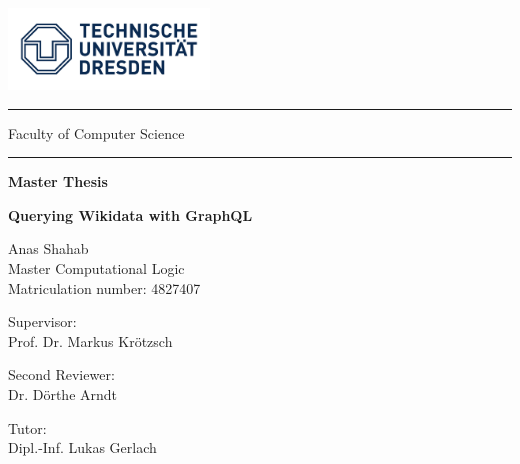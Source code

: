 \begin{titlepage}

	\begin{doublespace}

 
			\includegraphics[width=0.4\textwidth]{images/logo.jpg}

			\hrule
			\vspace*{0.15cm}
			{\Large Faculty of Computer Science}
			\vspace*{0.15cm}
			\hrule

		\begin{center}
        		\vspace{1cm}      
        
       		{\LARGE \textbf{Master Thesis} }
            
        		\vspace{0.25cm}
        
        		{\Large \textbf{Querying Wikidata with GraphQL} 
			}
            
        		\vspace{1.5cm}
        \end{center}
        
        
			Anas Shahab \\
    			Master Computational Logic \\
    			Matriculation number: 4827407
    		
    			\vspace{0.5cm}
    		
    			Supervisor: \\
	    		Prof. Dr. Markus Kr{\"otzsch}
    			
    			\vspace{0.25cm}
    		
    			Second Reviewer: \\
			Dr. Dörthe Arndt
    			
    			\vspace{0.25cm}
    		
    			
    			Tutor: \\
    			Dipl.-Inf. Lukas Gerlach
    		

\end{doublespace}
\end{titlepage}
